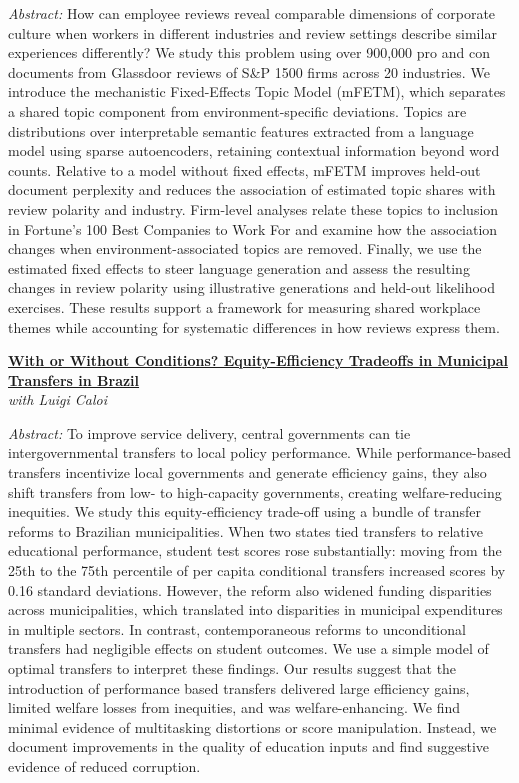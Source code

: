 \documentclass[10pt,letterpaper]{article}
\begin{document}
\medskip

\textit{Abstract:} How can employee reviews reveal comparable dimensions of corporate culture when workers in different industries and review settings describe similar experiences differently? We study this problem using over 900,000 pro and con documents from Glassdoor reviews of S\&P 1500 firms across 20 industries. We introduce the mechanistic Fixed-Effects Topic Model (mFETM), which separates a shared topic component from environment-specific deviations. Topics are distributions over interpretable semantic features extracted from a language model using sparse autoencoders, retaining contextual information beyond word counts. Relative to a model without fixed effects, mFETM improves held-out document perplexity and reduces the association of estimated topic shares with review polarity and industry. Firm-level analyses relate these topics to inclusion in Fortune's 100 Best Companies to Work For and examine how the association changes when environment-associated topics are removed. Finally, we use the estimated fixed effects to steer language generation and assess the resulting changes in review polarity using illustrative generations and held-out likelihood exercises. These results support a framework for measuring shared workplace themes while accounting for systematic differences in how reviews express them.

\vspace{10pt}

\textbf{\href{https://andreaciccarone.github.io/PerformanceTransfers_draft.pdf}{With or Without Conditions? Equity-Efficiency Tradeoffs in Municipal Transfers in Brazil}}\\
\textit{with Luigi Caloi}

\medskip

\textit{Abstract:} To improve service delivery, central governments can tie intergovernmental transfers to local policy performance. While performance-based transfers incentivize local governments and generate efficiency gains, they also shift transfers from low- to high-capacity governments, creating welfare-reducing inequities. We study this equity-efficiency trade-off using a bundle of transfer reforms to Brazilian municipalities. When two states tied transfers to relative educational performance, student test scores rose substantially: moving from the 25th to the 75th percentile of per capita conditional transfers increased scores by 0.16 standard deviations. However, the reform also widened funding disparities across municipalities, which translated into disparities in municipal expenditures in multiple sectors. In contrast, contemporaneous reforms to unconditional transfers had negligible effects on student outcomes. We use a simple model of optimal transfers to interpret these findings. Our results suggest that the introduction of performance based transfers delivered large efficiency gains, limited welfare losses from inequities, and was welfare-enhancing. We find minimal evidence of multitasking distortions or score manipulation. Instead, we document improvements in the quality of education inputs and find suggestive evidence of reduced corruption.
\end{document}
